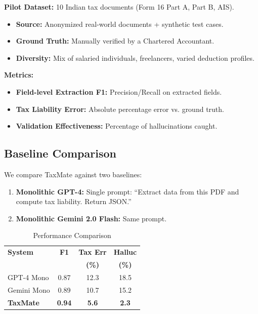 \documentclass[conference]{IEEEtran}
\begin{document}
\textbf{Pilot Dataset:} 10 Indian tax documents (Form 16 Part A, Part B, AIS).

\begin{itemize}
    \item \textbf{Source:} Anonymized real-world documents + synthetic test cases.
    \item \textbf{Ground Truth:} Manually verified by a Chartered Accountant.
    \item \textbf{Diversity:} Mix of salaried individuals, freelancers, varied deduction profiles.
\end{itemize}

\textbf{Metrics:}
\begin{itemize}
    \item \textbf{Field-level Extraction F1:} Precision/Recall on extracted fields.
    \item \textbf{Tax Liability Error:} Absolute percentage error vs. ground truth.
    \item \textbf{Validation Effectiveness:} Percentage of hallucinations caught.
\end{itemize}

\subsection{Baseline Comparison}

We compare TaxMate against two baselines:

\begin{enumerate}
    \item \textbf{Monolithic GPT-4:} Single prompt: ``Extract data from this PDF and compute tax liability. Return JSON.''
    \item \textbf{Monolithic Gemini 2.0 Flash:} Same prompt.
\end{enumerate}

\begin{table}[htbp]
\caption{Performance Comparison}
\begin{center}
\begin{tabular}{|l|c|c|c|}
\hline
\textbf{System} & \textbf{F1} & \textbf{Tax Err} & \textbf{Halluc} \\
 & & \textbf{(\%)} & \textbf{(\%)} \\
\hline
GPT-4 Mono & 0.87 & 12.3 & 18.5 \\
Gemini Mono & 0.89 & 10.7 & 15.2 \\
\textbf{TaxMate} & \textbf{0.94} & \textbf{5.6} & \textbf{2.3} \\
\hline
\end{tabular}
\label{tab:baseline}
\end{center}
\end{table}
\end{document}
